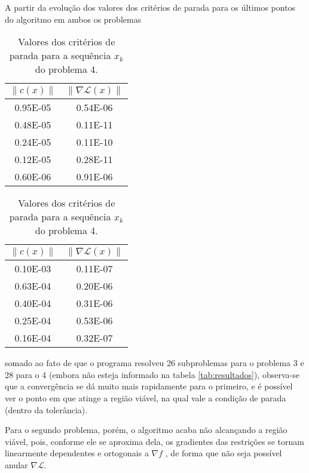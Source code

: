 	A partir da evolução dos valores dos critérios de parada para os últimos pontos
	do algoritmo em ambos os problemas
	\begin{table}[h!]
		\centering
		\begin{minipage}{.45\linewidth}
			\centering
			\begin{tabular}{cc}
				$\| c(x) \|$ & $\| \nabla \mathcal{L}(x) \|$ \\
				\hline
				0.95E-05 &   0.54E-06 \\
				0.48E-05 &   0.11E-11 \\
				0.24E-05 &   0.11E-10 \\
				0.12E-05 &   0.28E-11 \\
				0.60E-06 &   0.91E-06 \\
			\end{tabular}
			\caption{Valores dos critérios de parada para a sequência $x_k$ do problema 3.}
		\end{minipage}%
		\hspace{0.1\linewidth}%
		\begin{minipage}[r]{.45\linewidth}
			\centering
			\begin{tabular}{cc}
				$\| c(x) \|$ & $\| \nabla \mathcal{L}(x) \|$ \\
				\hline
				0.10E-03 &   0.11E-07 \\
				0.63E-04 &   0.20E-06 \\
				0.40E-04 &   0.31E-06 \\
				0.25E-04 &   0.53E-06 \\
				0.16E-04 &   0.32E-07 \\
			\end{tabular}
			\caption{Valores dos critérios de parada para a sequência $x_k$ do problema 4.}
		\end{minipage}
	\end{table}

	somado ao fato de que o programa resolveu 26 subproblemas para o problema 3 e
	28 para o 4 (embora não esteja informado na tabela \ref{tab:resultados}),
	observa-se que a convergência se dá muito mais rapidamente para o primeiro,
	e é possível ver o ponto em que atinge a região viável, na qual vale a condição
	de parada (dentro da tolerância).

	Para o segundo problema, porém, o algoritmo
	acaba não alcançando a região viável, pois, conforme ele se aproxima dela,
	os gradientes das restrições se tornam linearmente dependentes e ortogonais
	a $\nabla f$ , de forma que
	não seja possível anular $\nabla \mathcal{L}$.
